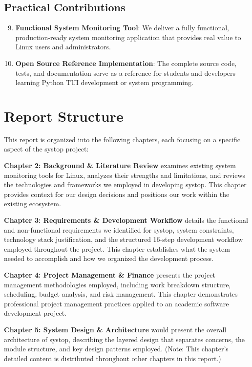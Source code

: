 \documentclass[12pt,a4paper,oneside]{report}
\begin{document}
\subsection{Practical Contributions}

\begin{enumerate}
    \setcounter{enumi}{8}
    \item \textbf{Functional System Monitoring Tool}: We deliver a fully functional, production-ready system monitoring application that provides real value to Linux users and administrators.
    
    \item \textbf{Open Source Reference Implementation}: The complete source code, tests, and documentation serve as a reference for students and developers learning Python TUI development or system programming.
\end{enumerate}

\section{Report Structure}
\label{sec:report-structure}

This report is organized into the following chapters, each focusing on a specific aspect of the systop project:

\textbf{Chapter 2: Background \& Literature Review} examines existing system monitoring tools for Linux, analyzes their strengths and limitations, and reviews the technologies and frameworks we employed in developing systop. This chapter provides context for our design decisions and positions our work within the existing ecosystem.

\textbf{Chapter 3: Requirements \& Development Workflow} details the functional and non-functional requirements we identified for systop, system constraints, technology stack justification, and the structured 16-step development workflow employed throughout the project. This chapter establishes what the system needed to accomplish and how we organized the development process.

\textbf{Chapter 4: Project Management \& Finance} presents the project management methodologies employed, including work breakdown structure, scheduling, budget analysis, and risk management. This chapter demonstrates professional project management practices applied to an academic software development project.

\textbf{Chapter 5: System Design \& Architecture} would present the overall architecture of systop, describing the layered design that separates concerns, the module structure, and key design patterns employed. (Note: This chapter's detailed content is distributed throughout other chapters in this report.)
\end{document}
